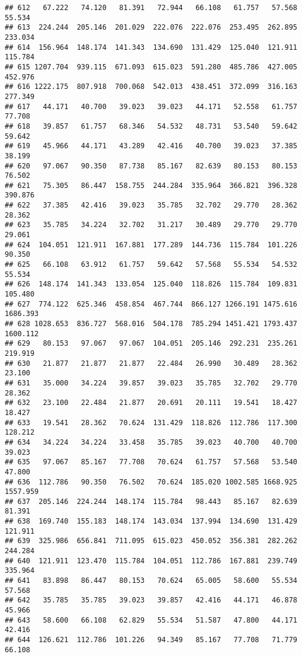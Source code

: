 \documentclass[
]{article}
\begin{document}
\begin{verbatim}
## 612   67.222   74.120   81.391   72.944   66.108   61.757   57.568   55.534
## 613  224.244  205.146  201.029  222.076  222.076  253.495  262.895  233.034
## 614  156.964  148.174  141.343  134.690  131.429  125.040  121.911  115.784
## 615 1207.704  939.115  671.093  615.023  591.280  485.786  427.005  452.976
## 616 1222.175  807.918  700.068  542.013  438.451  372.099  316.163  277.349
## 617   44.171   40.700   39.023   39.023   44.171   52.558   61.757   77.708
## 618   39.857   61.757   68.346   54.532   48.731   53.540   59.642   59.642
## 619   45.966   44.171   43.289   42.416   40.700   39.023   37.385   38.199
## 620   97.067   90.350   87.738   85.167   82.639   80.153   80.153   76.502
## 621   75.305   86.447  158.755  244.284  335.964  366.821  396.328  390.876
## 622   37.385   42.416   39.023   35.785   32.702   29.770   28.362   28.362
## 623   35.785   34.224   32.702   31.217   30.489   29.770   29.770   29.061
## 624  104.051  121.911  167.881  177.289  144.736  115.784  101.226   90.350
## 625   66.108   63.912   61.757   59.642   57.568   55.534   54.532   55.534
## 626  148.174  141.343  133.054  125.040  118.826  115.784  109.831  105.480
## 627  774.122  625.346  458.854  467.744  866.127 1266.191 1475.616 1686.393
## 628 1028.653  836.727  568.016  504.178  785.294 1451.421 1793.437 1600.112
## 629   80.153   97.067   97.067  104.051  205.146  292.231  235.261  219.919
## 630   21.877   21.877   21.877   22.484   26.990   30.489   28.362   23.100
## 631   35.000   34.224   39.857   39.023   35.785   32.702   29.770   28.362
## 632   23.100   22.484   21.877   20.691   20.111   19.541   18.427   18.427
## 633   19.541   28.362   70.624  131.429  118.826  112.786  117.300  128.212
## 634   34.224   34.224   33.458   35.785   39.023   40.700   40.700   39.023
## 635   97.067   85.167   77.708   70.624   61.757   57.568   53.540   47.800
## 636  112.786   90.350   76.502   70.624  185.020 1002.585 1668.925 1557.959
## 637  205.146  224.244  148.174  115.784   98.443   85.167   82.639   81.391
## 638  169.740  155.183  148.174  143.034  137.994  134.690  131.429  121.911
## 639  325.986  656.841  711.095  615.023  450.052  356.381  282.262  244.284
## 640  121.911  123.470  115.784  104.051  112.786  167.881  239.749  335.964
## 641   83.898   86.447   80.153   70.624   65.005   58.600   55.534   57.568
## 642   35.785   35.785   39.023   39.857   42.416   44.171   46.878   45.966
## 643   58.600   66.108   62.829   55.534   51.587   47.800   44.171   42.416
## 644  126.621  112.786  101.226   94.349   85.167   77.708   71.779   66.108

\end{verbatim}
\end{document}
